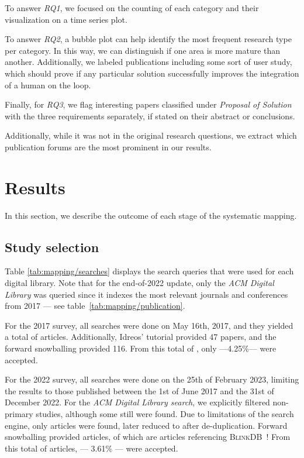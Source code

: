 To answer \emph{RQ1}, we focused on the counting of each category
and their visualization on a time series plot.

To answer \emph{RQ2}, a bubble plot can help identify
the most frequent research type per category. In this way, we can distinguish if
one area is more mature than another. Additionally, we labeled
publications including some sort of user study, which should prove
if any particular solution successfully improves the integration of a
human on the loop.

Finally, for \emph{RQ3}, we flag interesting papers classified under
\emph{Proposal of Solution} with the three requirements separately, if stated
on their abstract or conclusions.

Additionally, while it was not in the original research questions, we
extract which publication forums are the most prominent in our results.

\section{Results}
\label{sec:mapping/results}
In this section, we describe the outcome of each stage of the systematic mapping.

\subsection{Study selection}
Table \ref{tab:mapping/searches} displays the search queries that were used for
each digital library. Note that for the end-of-2022 update, only the \emph{ACM Digital Library}
was queried since it indexes the most relevant journals and conferences from 2017 ---
see table~\ref{tab:mapping/publication}.

For the 2017 survey, all searches were done on May 16th, 2017, and they yielded a total of  articles.
Additionally, Idreos' tutorial provided 47 papers, and the forward snowballing provided 116.
From this total of , only  ---4.25\%--- were accepted.

For the 2022 survey, all searches were done on the 25th of February 2023, limiting the results 
to those published between the 1st of June 2017 and the 31st of December 2022. For the \emph{ACM
Digital Library search}, we explicitly filtered non-primary studies, although some still were found.
Due to limitations of the search engine, only  articles were found, later reduced to 
 after de-duplication\footnotemark. Forward snowballing provided  articles, 
of which  are articles referencing \textsc{BlinkDB}~\cite{Agarwal2013}!
From this total of  articles,  --- 3.61\% --- were accepted.

